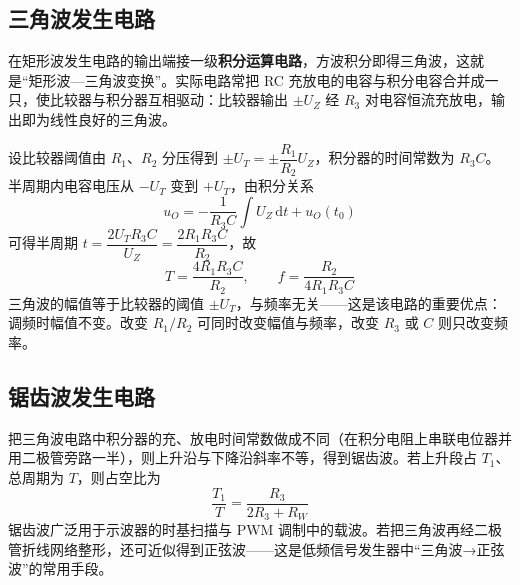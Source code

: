 \subsection{三角波发生电路}
在矩形波发生电路的输出端接一级\textbf{积分运算电路}，方波积分即得三角波，这就是“矩形波—三角波变换”。实际电路常把 RC 充放电的电容与积分电容合并成一只，使比较器与积分器互相驱动：比较器输出 $\pm U_Z$ 经 $R_3$ 对电容恒流充放电，输出即为线性良好的三角波。

设比较器阈值由 $R_1$、$R_2$ 分压得到 $\pm U_T=\pm\dfrac{R_1}{R_2}U_Z$，积分器的时间常数为 $R_3C$。半周期内电容电压从 $-U_T$ 变到 $+U_T$，由积分关系
\begin{equation}
u_O=-\frac{1}{R_3C}\int U_Z\,\mathrm{d}t+u_O(t_0)
\end{equation}
可得半周期 $t=\dfrac{2U_T R_3C}{U_Z}=\dfrac{2R_1R_3C}{R_2}$，故
\begin{equation}
T=\frac{4R_1R_3C}{R_2},\qquad f=\frac{R_2}{4R_1R_3C}
\end{equation}
三角波的幅值等于比较器的阈值 $\pm U_T$，与频率无关——这是该电路的重要优点：调频时幅值不变。改变 $R_1/R_2$ 可同时改变幅值与频率，改变 $R_3$ 或 $C$ 则只改变频率。

\subsection{锯齿波发生电路}
把三角波电路中积分器的充、放电时间常数做成不同（在积分电阻上串联电位器并用二极管旁路一半），则上升沿与下降沿斜率不等，得到锯齿波。若上升段占 $T_1$、总周期为 $T$，则占空比为
\begin{equation}
\frac{T_1}{T}=\frac{R_3}{2R_3+R_W}
\end{equation}
锯齿波广泛用于示波器的时基扫描与 PWM 调制中的载波。若把三角波再经二极管折线网络整形，还可近似得到正弦波——这是低频信号发生器中“三角波→正弦波”的常用手段。

